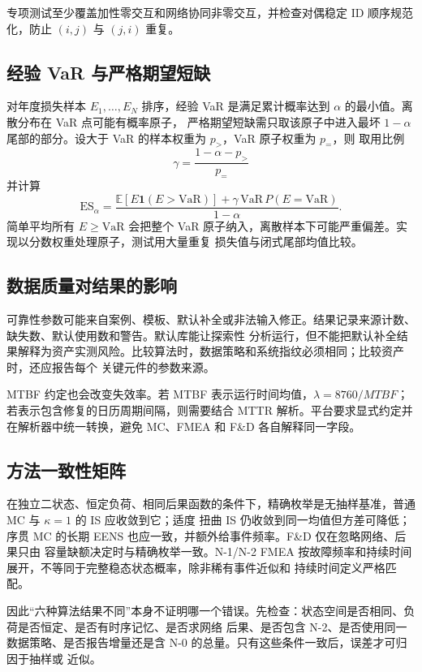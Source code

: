 专项测试至少覆盖加性零交互和网络协同非零交互，并检查对偶稳定 ID 顺序规范化，防止 $(i,j)$ 与 $(j,i)$ 重复。

\subsection{经验 VaR 与严格期望短缺}
对年度损失样本 $E_1,\ldots,E_N$ 排序，经验 VaR 是满足累计概率达到 $\alpha$ 的最小值。离散分布在 VaR 点可能有概率原子，
严格期望短缺需只取该原子中进入最坏 $1-\alpha$ 尾部的部分。设大于 VaR 的样本权重为 $p_>$，VaR 原子权重为 $p_=$，则
取用比例
\begin{equation}
 \gamma=\frac{1-\alpha-p_>}{p_=}
\end{equation}
并计算
\begin{equation}
 \mathrm{ES}_{\alpha}=\frac{
 \mathbb E[E\mathbf1(E>\mathrm{VaR})]
 +\gamma\,\mathrm{VaR}\,P(E=\mathrm{VaR})}{1-\alpha}.
\end{equation}
简单平均所有 $E\ge\mathrm{VaR}$ 会把整个 VaR 原子纳入，离散样本下可能严重偏差。实现以分数权重处理原子，测试用大量重复
损失值与闭式尾部均值比较。

\subsection{数据质量对结果的影响}
可靠性参数可能来自案例、模板、默认补全或非法输入修正。结果记录来源计数、缺失数、默认使用数和警告。默认库能让探索性
分析运行，但不能把默认补全结果解释为资产实测风险。比较算法时，数据策略和系统指纹必须相同；比较资产时，还应报告每个
关键元件的参数来源。

MTBF 约定也会改变失效率。若 MTBF 表示运行时间均值，$\lambda=8760/MTBF$；若表示包含修复的日历周期间隔，则需要结合
MTTR 解析。平台要求显式约定并在解析器中统一转换，避免 MC、FMEA 和 F\&D 各自解释同一字段。

\subsection{方法一致性矩阵}
在独立二状态、恒定负荷、相同后果函数的条件下，精确枚举是无抽样基准，普通 MC 与 $\kappa=1$ 的 IS 应收敛到它；适度
扭曲 IS 仍收敛到同一均值但方差可降低；序贯 MC 的长期 EENS 也应一致，并额外给事件频率。F\&D 仅在忽略网络、后果只由
容量缺额决定时与精确枚举一致。N-1/N-2 FMEA 按故障频率和持续时间展开，不等同于完整稳态状态概率，除非稀有事件近似和
持续时间定义严格匹配。

因此“六种算法结果不同”本身不证明哪一个错误。先检查：状态空间是否相同、负荷是否恒定、是否有时序记忆、是否求网络
后果、是否包含 N-2、是否使用同一数据策略、是否报告增量还是含 N-0 的总量。只有这些条件一致后，误差才可归因于抽样或
近似。

